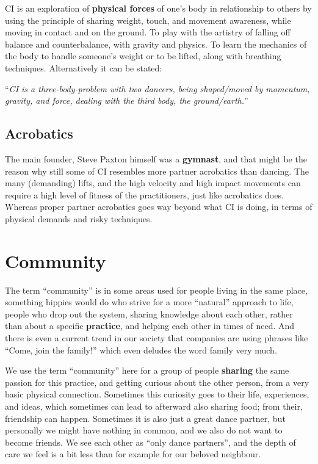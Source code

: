 CI is an exploration of \textbf{physical forces} of one's body in relationship to others by using the principle of sharing weight, touch, and movement awareness, while moving in contact and on the ground.
To play with the artistry of falling off balance and counterbalance, with gravity and physics.
To learn the mechanics of the body to handle someone's weight or to be lifted, along with breathing techniques.
Alternatively it can be stated:

\begin{center}
	``\textit{CI is a three-body-problem with two dancers, being shaped/moved by momentum, gravity, and force, dealing with the third body, the ground/earth.}''
\end{center}

\subsection{Acrobatics}\label{subsec:acrobatics}

The main founder, Steve Paxton himself was a \textbf{gymnast}, and that might be the reason why still some of CI resembles more partner acrobatics than dancing.
The many (demanding) lifts, and the high velocity and high impact movements can require a high level of fitness of the practitioners, just like acrobatics does.
Whereas proper partner acrobatics goes way beyond what CI is doing, in terms of physical demands and risky techniques.

\section{Community}\label{sec:community}

The term ``community'' is in some areas used for people living in the same place, something hippies would do who strive for a more ``natural'' approach to life, people who drop out the system, sharing knowledge about each other, rather than about a specific \textbf{practice}, and helping each other in times of need.
And there is even a current trend in our society that companies are using phrases like ``Come, join the family!'' which even deludes the word family very much.

We use the term ``community'' here for a group of people \textbf{sharing} the same passion for this practice, and getting curious about the other person, from a very basic physical connection.
Sometimes this curiosity goes to their life, experiences, and ideas, which sometimes can lead to afterward also sharing food; from their, friendship can happen.
Sometimes it is also just a great dance partner, but personally we might have nothing in common, and we also do not want to become friends.
We see each other as ``only dance partners'', and the depth of care we feel is a bit less than for example for our beloved neighbour.

